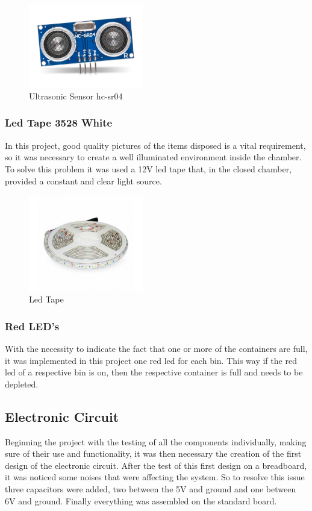 \documentclass[a4paper,11pt]{article}
\begin{document}
\begin{figure}[H]
  \centering
  \includegraphics[width=5cm]{Figures/ultrasonico_hc.jpg}
  \caption{\small{Ultrasonic Sensor hc-sr04}}
  \label{fig:ultrasonic}
\end{figure}

\subsubsection{Led Tape 3528 White}
In this project, good quality pictures of the items disposed is a vital requirement, so it was necessary to create a well illuminated environment inside the chamber. To solve this problem it was used a 12V led tape that, in the closed chamber, provided a constant and clear light source.

\begin{figure}[H]
  \centering
  \includegraphics[width=5cm]{Figures/ledtape.jpg}
  \caption{\small{Led Tape}}
  \label{fig:ledtape}
\end{figure}

\subsubsection{Red LED's}
With the necessity to indicate the fact that one or more of the containers are full, it was implemented in this project one red led for each bin. This way if the red led of a respective bin is on, then the respective container is full and needs to be depleted.

\subsection{Electronic Circuit}
Beginning the project with the testing of all the components individually, making sure of their use and functionality, it was then necessary the creation of the first design of the electronic circuit. After the test of this first design on a breadboard, it was noticed some noises that were affecting the system. So to resolve this issue three capacitors were added, two between the 5V and ground and one between 6V and ground. Finally everything was assembled on the standard board.
\end{document}

